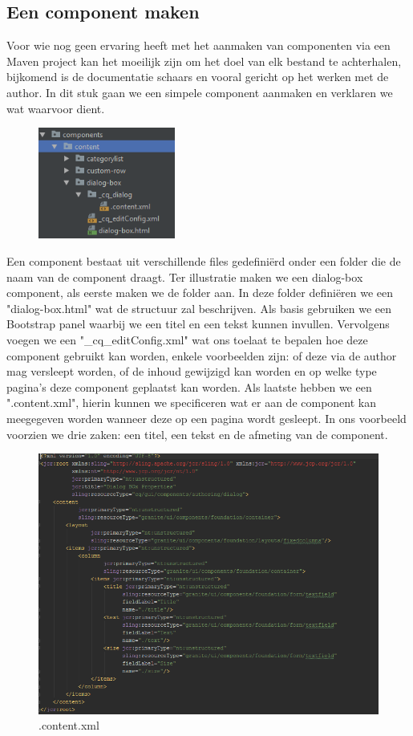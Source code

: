 \documentclass{article}
\begin{document}
	\subsection{Een component maken}
	Voor wie nog geen ervaring heeft met het aanmaken van componenten via een Maven project kan het moeilijk zijn om het doel van elk bestand te achterhalen, bijkomend is de documentatie schaars en vooral gericht op het werken met de author. In dit stuk gaan we een simpele component aanmaken en verklaren we wat waarvoor dient.
	\par
	\begin{figure}
  		\includegraphics[width=0.4\textwidth]{images/component-pck-structure.PNG}
	\end{figure}
	Een component bestaat uit verschillende files gedefini\"erd onder een folder die de naam van de component draagt. Ter illustratie maken we een dialog-box component, als eerste maken we de folder aan. In deze folder defini\"eren we een "dialog-box.html" wat de structuur zal beschrijven. Als basis gebruiken we een Bootstrap panel waarbij we een titel en een tekst kunnen invullen. Vervolgens voegen we een "\_cq\_editConfig.xml" wat ons toelaat te bepalen hoe deze component gebruikt kan worden, enkele voorbeelden zijn: of deze via de author mag versleept worden, of de inhoud gewijzigd kan worden en op welke type pagina's deze component geplaatst kan worden. Als laatste hebben we een ".content.xml", hierin kunnen we specificeren wat er aan de component kan meegegeven worden wanneer deze op een pagina wordt gesleept. In ons voorbeeld voorzien we drie zaken: een titel, een tekst en de afmeting van de component.
	\begin{figure}[h!]
  		\includegraphics[width=\linewidth]{images/content-xml.PNG}
  		\caption{.content.xml}
  	\end{figure}
\end{document}
